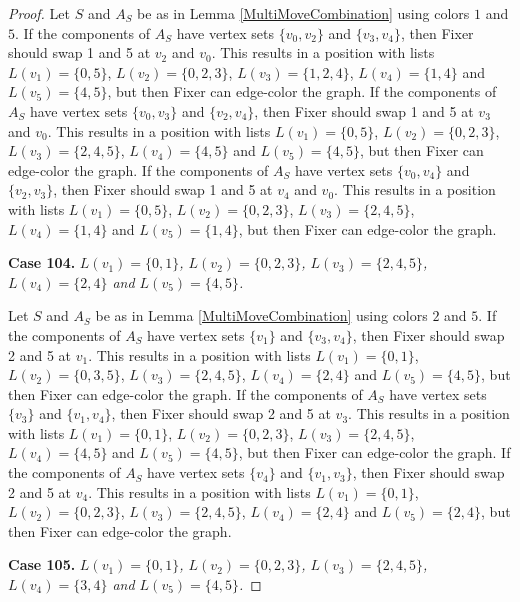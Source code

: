 \documentclass[12pt]{amsart}
\theoremstyle{plain}
\theoremstyle{definition}
\theoremstyle{remark}
\begin{document}
\begin{proof}
Let $S$ and $A_S$ be as in Lemma \ref{MultiMoveCombination} using colors $1$ and $5$. If the components of $A_S$ have vertex sets $\{v_0, v_2\}$ and $\{v_3, v_4\}$, then Fixer should swap 1 and 5 at $v_2$ and $v_0$. This results in a position with lists $L(v_1) = \{0, 5\}$, $L(v_2) = \{0, 2, 3\}$, $L(v_3) = \{1, 2, 4\}$, $L(v_4) = \{1, 4\}$ and $L(v_5) = \{4, 5\}$, but then Fixer can edge-color the graph.
If the components of $A_S$ have vertex sets $\{v_0, v_3\}$ and $\{v_2, v_4\}$, then Fixer should swap 1 and 5 at $v_3$ and $v_0$. This results in a position with lists $L(v_1) = \{0, 5\}$, $L(v_2) = \{0, 2, 3\}$, $L(v_3) = \{2, 4, 5\}$, $L(v_4) = \{4, 5\}$ and $L(v_5) = \{4, 5\}$, but then Fixer can edge-color the graph.
If the components of $A_S$ have vertex sets $\{v_0, v_4\}$ and $\{v_2, v_3\}$, then Fixer should swap 1 and 5 at $v_4$ and $v_0$. This results in a position with lists $L(v_1) = \{0, 5\}$, $L(v_2) = \{0, 2, 3\}$, $L(v_3) = \{2, 4, 5\}$, $L(v_4) = \{1, 4\}$ and $L(v_5) = \{1, 4\}$, but then Fixer can edge-color the graph.

\noindent\textbf{Case 104.  }\textit{$L(v_1) = \{0, 1\}$, $L(v_2) = \{0, 2, 3\}$, $L(v_3) = \{2, 4, 5\}$, $L(v_4) = \{2, 4\}$ and $L(v_5) = \{4, 5\}$.}

Let $S$ and $A_S$ be as in Lemma \ref{MultiMoveCombination} using colors $2$ and $5$. If the components of $A_S$ have vertex sets $\{v_1\}$ and $\{v_3, v_4\}$, then Fixer should swap 2 and 5 at $v_1$. This results in a position with lists $L(v_1) = \{0, 1\}$, $L(v_2) = \{0, 3, 5\}$, $L(v_3) = \{2, 4, 5\}$, $L(v_4) = \{2, 4\}$ and $L(v_5) = \{4, 5\}$, but then Fixer can edge-color the graph.
If the components of $A_S$ have vertex sets $\{v_3\}$ and $\{v_1, v_4\}$, then Fixer should swap 2 and 5 at $v_3$. This results in a position with lists $L(v_1) = \{0, 1\}$, $L(v_2) = \{0, 2, 3\}$, $L(v_3) = \{2, 4, 5\}$, $L(v_4) = \{4, 5\}$ and $L(v_5) = \{4, 5\}$, but then Fixer can edge-color the graph.
If the components of $A_S$ have vertex sets $\{v_4\}$ and $\{v_1, v_3\}$, then Fixer should swap 2 and 5 at $v_4$. This results in a position with lists $L(v_1) = \{0, 1\}$, $L(v_2) = \{0, 2, 3\}$, $L(v_3) = \{2, 4, 5\}$, $L(v_4) = \{2, 4\}$ and $L(v_5) = \{2, 4\}$, but then Fixer can edge-color the graph.

\noindent\textbf{Case 105.  }\textit{$L(v_1) = \{0, 1\}$, $L(v_2) = \{0, 2, 3\}$, $L(v_3) = \{2, 4, 5\}$, $L(v_4) = \{3, 4\}$ and $L(v_5) = \{4, 5\}$.}


\end{proof}
\end{document}
